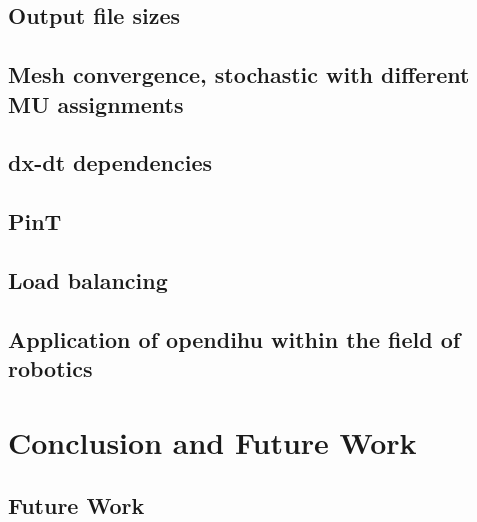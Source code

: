 \section{Output file sizes}
\section{Mesh convergence, stochastic with different MU assignments}
\section{dx-dt dependencies}
\section{PinT}
\section{Load balancing}
\section{Application of opendihu within the field of robotics}

\chapter{Conclusion and Future Work}\label{sec:conclusion_and_future_work}

\section{Future Work}\label{sec:future_work}





